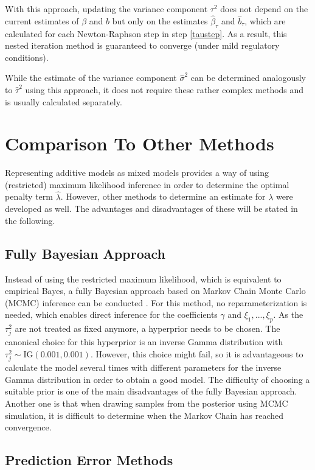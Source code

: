 \documentclass[12pt]{article}
\begin{document}
With this approach, updating the variance component $\tau^2$ does not depend on the current estimates of $\beta$ and $b$ but only on the estimates $\hat{\beta}_{\tau}$ and $\hat{b}_\tau$, which are calculated for each Newton-Raphson step in step \ref{taustep}. As a result, this nested iteration method is guaranteed to converge (under mild regulatory conditions).

While the estimate of the variance component $\hat{\sigma}^2$ can be determined analogously to $\hat{\tau}^2$ using this approach, it does not require these rather complex methods and is usually calculated separately.


\section{Comparison To Other Methods} %

Representing additive models as mixed models provides a way of using (restricted) maximum likelihood inference in order to determine the optimal penalty term $\hat{\lambda}$. However, other methods to determine an estimate for $\lambda$ were developed as well. The advantages and disadvantages of these will be stated in the following.

\subsection{Fully Bayesian Approach}

Instead of using the restricted maximum likelihood, which is equivalent to empirical Bayes, a fully Bayesian approach based on Markov Chain Monte Carlo (MCMC) inference can be conducted \cite{kneib2006mixed}. For this method, no reparameterization is needed, which enables direct inference for the coefficients $\gamma$ and $\xi_1,...,\xi_p$. 
As the $\tau_j^2$ are not treated as fixed anymore, a hyperprior needs to be chosen. The canonical choice for this hyperprior is an inverse Gamma distribution with $\tau^2_j \sim \text{IG}(0.001,0.001)$. However, this choice might fail, so it is advantageous to calculate the model several times with different parameters for the inverse Gamma distribution in order to obtain a good model. The difficulty of choosing a suitable prior is one of the main disadvantages of the fully Bayesian approach. Another one is that when drawing samples from the posterior using MCMC simulation, it is difficult to determine when the Markov Chain has reached convergence.


\subsection{Prediction Error Methods}
\end{document}
